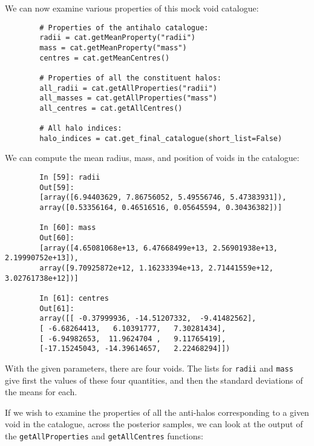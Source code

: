 \documentclass{article}
\newcommand{\codefont}[1]{{\texttt{#1}}}
\begin{document}
	We can now examine various properties of this mock void catalogue:
	\begin{verbatim}
		# Properties of the antihalo catalogue:
		radii = cat.getMeanProperty("radii")
		mass = cat.getMeanProperty("mass")
		centres = cat.getMeanCentres()
		
		# Properties of all the constituent halos:
		all_radii = cat.getAllProperties("radii")
		all_masses = cat.getAllProperties("mass")
		all_centres = cat.getAllCentres()
		
		# All halo indices:
		halo_indices = cat.get_final_catalogue(short_list=False)
	\end{verbatim}
	
	We can compute the mean radius, mass, and position of voids in the catalogue:
	\begin{verbatim}
		In [59]: radii
		Out[59]:
		[array([6.94403629, 7.86756052, 5.49556746, 5.47383931]),
		array([0.53356164, 0.46516516, 0.05645594, 0.30436382])]
		
		In [60]: mass
		Out[60]:
		[array([4.65081068e+13, 6.47668499e+13, 2.56901938e+13, 2.19990752e+13]),
		array([9.70925872e+12, 1.16233394e+13, 2.71441559e+12, 3.02761738e+12])]
		
		In [61]: centres
		Out[61]:
		array([[ -0.37999936, -14.51207332,  -9.41482562],
		[ -6.68264413,   6.10391777,   7.30281434],
		[ -6.94982653,  11.9624704 ,   9.11765419],
		[-17.15245043, -14.39614657,   2.22468294]])
	\end{verbatim}
	With the given parameters, there are four voids. The lists for \codefont{radii} and \codefont{mass} give first the values of these four quantities, and then the standard deviations of the means for each.
	
	If we wish to examine the properties of all the anti-halos corresponding to a given void in the catalogue, across the posterior samples, we can look at the output of the \codefont{getAllProperties} and \codefont{getAllCentres} functions:
	
\end{document}
